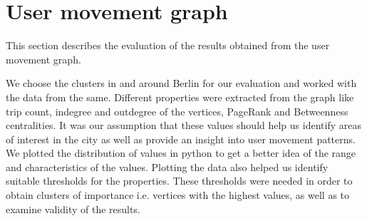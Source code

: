 \section{User movement graph}
This section describes the evaluation of the results obtained from the user movement graph. 

We choose the clusters in and around Berlin for our evaluation and worked with the data from the same. Different properties were extracted from the graph like trip count, indegree and outdegree of the vertices, PageRank and Betweenness centralities. It was our assumption that these values should help us identify areas of interest in the city as well as provide an insight into user movement patterns. We plotted the distribution of values in python to get a better idea of the range and characteristics of the values. Plotting the data also helped us identify suitable thresholds for the properties. These thresholds were needed in order to obtain clusters of importance i.e. vertices with the highest values, as well as to examine validity of the results.

